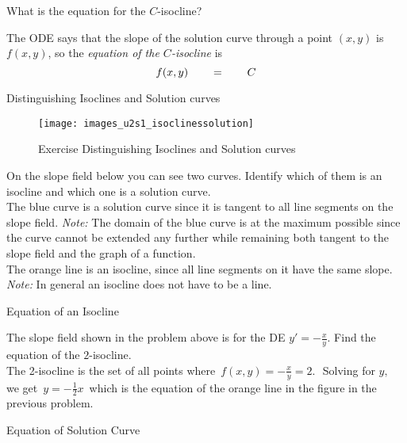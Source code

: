 \begin{question}
  What is the equation for the $C$-isocline?
\end{question}

\Answer The ODE says that the slope of the solution curve through a point
$(x, y)$ is $f(x,y)$, so the \emph{\color{blue}equation of the $C$-isocline} is
\begin{equation*}
  \displaystyle  \displaystyle f(x,y) \qquad \displaystyle = \qquad \displaystyle C
\end{equation*}

\begin{exercise}
  Distinguishing Isoclines and Solution curves
\end{exercise}

\begin{figure}[ht!]
  \centering
  \texttt{[image: images\_u2s1\_isoclinessolution]}
  \caption{Exercise Distinguishing Isoclines and Solution curves}
\end{figure}

On the slope field below you can see two curves.
Identify which of them is an isocline and which one is a solution curve.\\

The blue curve is a solution curve since it is tangent to all line segments on the slope field. 
\emph{Note:} The domain of the blue curve is at the maximum possible
since the curve cannot be extended any further while remaining both tangent
to the slope field and the graph of a function.\\
The orange line is an isocline, since all line segments on it have the same slope. 
\emph{Note:} In general an isocline does not have to be a line.

\begin{exercise}
  Equation of an Isocline
\end{exercise}

The slope field shown in the problem above is for the DE $y' = - \frac{x}{y}$.
Find the equation of the $2$-isocline.\\

The 2-isocline is the set of all points where $\displaystyle \, f(x,y)=-\frac{x}{y}=2.\, \,$
Solving for $y,\,$ we get $\, y= -\frac{1}{2}x\,$
which is the equation of the orange line in the figure in the previous problem.

\begin{exercise}
  Equation of Solution Curve
\end{exercise}

